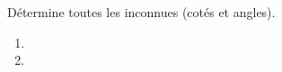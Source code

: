 %
%
    Détermine toutes les inconnues (cotés et angles).
    \begin{enumerate}[cols=2]
        \item 
        \item 
    \end{enumerate}
